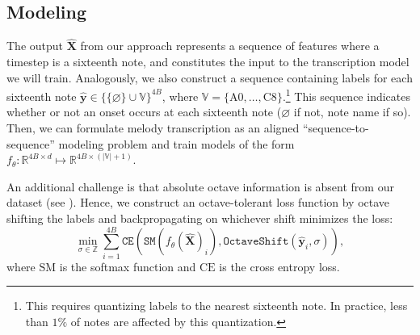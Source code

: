 \subsection{Modeling}
\label{sec:modeling}

The output $\hat{\bm{X}}$ from our \beatpooling{} approach represents a sequence of features where a timestep is a sixteenth note, and constitutes the input to the transcription model we will train. 
Analogously, we also construct a sequence containing labels for each sixteenth note ${\hat{\bm{y}} \in \{\{\varnothing\}\cup\mathbb{V}\}^{4B}}$, where 
${\mathbb{V} = \{\text{A0}, \ldots, \text{C8}\}}$.\footnote{This requires quantizing labels to the nearest sixteenth note. In practice, less than $1\%$ of notes are affected by this quantization.
} 
This sequence indicates whether or not an onset occurs at each sixteenth note ($\varnothing$ if not, note name if so). 
Then, we can formulate melody transcription as an aligned ``sequence-to-sequence'' modeling problem and train models of the form ${f_{\theta} : \mathbb{R}^{4B \times d} \mapsto \mathbb{R}^{4B \times (|\mathbb{V}|+1)}}$.

An additional challenge is that absolute octave information is absent from our dataset (see ). 
Hence, we construct an octave-tolerant loss function by octave shifting the labels and backpropagating on whichever shift minimizes the loss:
\begin{equation*}
\operatorname*{min}_{\sigma \in \mathbb{Z}} \sum_{i=1}^{4B} \texttt{CE}(\texttt{SM}(f_{\theta}(\bm{\hat{X}})_i), \texttt{OctaveShift}(\hat{\bm{y}}_i, \sigma)),
\end{equation*}
where $\text{SM}$ is the softmax function and $\text{CE}$ is the cross entropy loss.

